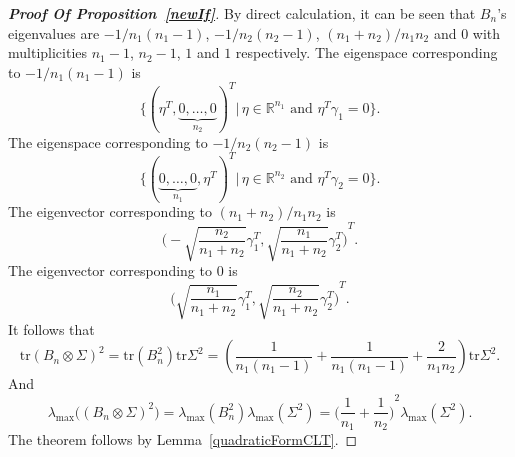\documentclass[review]{elsarticle}
\theoremstyle{plain}
\theoremstyle{definition}
\theoremstyle{remark}
\begin{document}
\begin{proof}[\textbf{Proof Of Proposition~\ref{newIf}}]
    By direct calculation, it can be seen that $B_n$'s eigenvalues are $-1/n_1(n_1-1)$, $-1/n_2(n_2-1)$, $(n_1+n_2)/n_1 n_2$ and $0$ with multiplicities $n_1-1$, $n_2-1$, $1$ and $1$ respectively.
    The eigenspace corresponding to $-1/n_1(n_1-1)$ is
    \begin{equation*}
        \{{(\eta^T,\underbrace{0,\ldots,0}_{n_2})}^T|\, \textrm{$\eta\in \mathbb{R}^{n_1}$ and $\eta^T \gamma_1=0$}\}.
    \end{equation*}
    The eigenspace corresponding to $-1/n_2(n_2-1)$ is
    \begin{equation*}
        \{{(\underbrace{0,\ldots,0}_{n_1},\eta^T)}^T| \, \textrm{$\eta\in\mathbb{R}^{n_2}$ and $\eta^T \gamma_2=0$}\}.
    \end{equation*}
    The eigenvector corresponding to $(n_1+n_2)/n_1n_2$ is
    \begin{equation*}
        {\Big(-\sqrt{\frac{n_2}{n_1+n_2}}\gamma_1^T, \sqrt{\frac{n_1}{n_1+n_2}}\gamma_2^T\Big)}^T.
    \end{equation*}
    The eigenvector corresponding to $0$ is
    \begin{equation*}
        {\Big(\sqrt{\frac{n_1}{n_1+n_2}}\gamma_1^T, \sqrt{\frac{n_2}{n_1+n_2}}\gamma_2^T\Big)}^T.
    \end{equation*}
It follows that 
    \begin{equation*}
        \mathrm{tr}{(B_n\otimes \Sigma)}^2=\mathrm{tr}(B_n^2)\mathrm{tr}\Sigma^2=(\frac{1}{n_1(n_1-1)}+\frac{1}{n_1(n_1-1)}+\frac{2}{n_1 n_2})\mathrm{tr}\Sigma^2.
    \end{equation*}
And
    \begin{equation*}
        \lambda_{\max}\Big({(B_n\otimes \Sigma)}^2\Big)=\lambda_{\max}(B_n^2)\lambda_{\max}(\Sigma^2)={\Big(\frac{1}{n_1}+\frac{1}{n_2}\Big)}^2\lambda_{\max}(\Sigma^2).
    \end{equation*}
    The theorem follows by Lemma~\ref{quadraticFormCLT}.
\end{proof}
\end{document}
